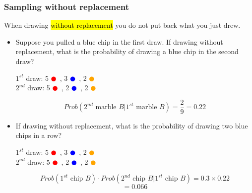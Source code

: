 
\begin{frame}
\frametitle{Sampling without replacement}

When drawing \hl{without replacement} you do not put back what you just drew.

\begin{itemize}

\pause

\item Suppose you pulled a blue chip in the first draw. If drawing without replacement, what is the probability of drawing a blue chip in the second draw?
\pause
\begin{center}
$1^{st}$ draw: 5 \textcolor{red}{$\CIRCLE$}~, 3 \textcolor{blue}{$\CIRCLE$}~, 2 \textcolor{orange}{$\CIRCLE$} \\
\pause
$2^{nd}$ draw: 5 \textcolor{red}{$\CIRCLE$}~, 2 \textcolor{blue}{$\CIRCLE$}~, 2 \textcolor{orange}{$\CIRCLE$}
\end{center}
\pause
\[ Prob(2^{nd} \text{ marble } B | 1^{st} \text{ marble } B) = \frac{2}{9} = 0.22 \]

\pause

\item If drawing without replacement, what is the probability of drawing two blue chips in a row?
\begin{center}

\pause
$1^{st}$ draw: 5 \textcolor{red}{$\CIRCLE$}~, 3 \textcolor{blue}{$\CIRCLE$}~, 2 \textcolor{orange}{$\CIRCLE$} \\
$2^{nd}$ draw: 5 \textcolor{red}{$\CIRCLE$}~, 2 \textcolor{blue}{$\CIRCLE$}~, 2 \textcolor{orange}{$\CIRCLE$}
\end{center}
\pause
\[ Prob(1^{st} \text{ chip } B) \cdot Prob(2^{nd} \text{ chip } B | 1^{st} \text{ chip } B)  = 0.3 \times 0.22 \]
\[ = 0.066 \]

\end{itemize}

\end{frame}


